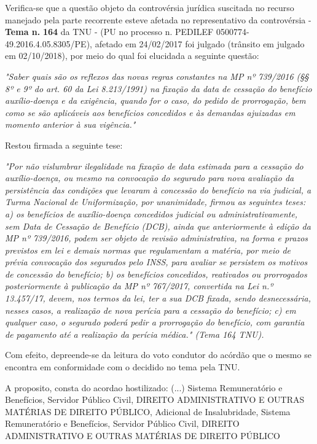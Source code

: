 \documentclass[12pt]{article}
\begin{document}
\justifying
\noindent Verifica-se que a questão objeto da controvérsia jurídica suscitada no recurso manejado pela parte recorrente esteve afetada no representativo da controvérsia - \textbf{Tema n. }\textbf{164} da TNU - (PU no processo n. PEDILEF 0500774-49.2016.4.05.8305/PE),  afetado em 24/02/2017 foi julgado (trânsito em julgado em 02/10/2018), por meio do qual foi elucidada a seguinte questão:

\noindent \textit{"Saber quais são os reflexos das novas regras constantes na MP nº 739/2016 (§§ 8º e 9º do art. 60 da Lei 8.213/1991) na fixação da data de cessação do benefício auxílio-doença e da exigência, quando for o caso, do pedido de prorrogação, bem como se são aplicáveis aos benefícios concedidos e às demandas ajuizadas em momento anterior à sua vigência."}

\noindent Restou firmada a seguinte tese:

\noindent \textit{"Por não vislumbrar ilegalidade na fixação de data estimada para a cessação do auxílio-doença, ou mesmo na convocação do segurado para nova avaliação da persistência das condições que levaram à concessão do benefício na via judicial, a Turma Nacional de Uniformização, por unanimidade, firmou as seguintes teses: a) os benefícios de auxílio-doença concedidos judicial ou administrativamente, sem Data de Cessação de Benefício (DCB), ainda que anteriormente à edição da MP nº 739/2016, podem ser objeto de revisão administrativa, na forma e prazos previstos em lei e demais normas que regulamentam a matéria, por meio de prévia convocação dos segurados pelo INSS, para avaliar se persistem os motivos de concessão do benefício; b) os benefícios concedidos, reativados ou prorrogados posteriormente à publicação da MP nº 767/2017, convertida na Lei n.º 13.457/17, devem, nos termos da lei, ter a sua DCB fixada, sendo desnecessária, nesses casos, a realização de nova perícia para a cessação do benefício; c) em qualquer caso, o segurado poderá pedir a prorrogação do benefício, com garantia de pagamento até a realização da perícia médica." (Tema 164 TNU).}

\noindent Com efeito, depreende-se da leitura do voto condutor do acórdão que o mesmo se encontra em conformidade com o decidido no  tema pela TNU.

\noindent A proposito, consta do acordao hostilizado: (...) Sistema Remuneratório e Benefícios, Servidor Público Civil, DIREITO ADMINISTRATIVO E OUTRAS MATÉRIAS DE DIREITO PÚBLICO, Adicional de Insalubridade, Sistema Remuneratório e Benefícios, Servidor Público Civil, DIREITO ADMINISTRATIVO E OUTRAS MATÉRIAS DE DIREITO PÚBLICO
\end{document}
